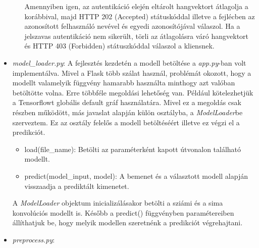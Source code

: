 \begin{itemize}
\begin{itemize}
		\newline
		\newline
		Amennyiben igen, az autentikáció elején eltárolt hangvektort átlagolja a korábbival, majd HTTP 202 (Accepted) státuskóddal illetve a fejlécben az azonosított felhasználó nevével és egyedi azonosítójával válaszol.
		\newline
		\newline
		Ha a jelszavas autentikáció nem sikerült, törli az átlagolásra váró hangvektort és HTTP 403 (Forbidden) státuszkóddal válaszol a kliensnek.
	\end{itemize}

	\item \emph{model\_loader.py}:
		A fejlesztés kezdetén a modell betöltése a \emph{app.py}-ban volt implementálva. Mivel a Flask több szálat használ, problémát okozott, hogy a modellt valamelyik függvény hamarabb használta minthogy azt valóban betöltötte volna.
		\newline
		\newline
		Erre többféle megoldási lehetőség van. Például kötelezhetjük a Tensorflowt globális default gráf használatára. Mivel ez a megoldás csak részben működött, más javaslat alapján külön osztályba, a \emph{ModelLoader}be szerveztem. Ez az osztály felelős a modell betöltéséért illetve ez végzi el a predikciót.
		\newline	

	\begin{itemize}
		\item load(file\_name): Betölti az paraméterként kapott útvonalon található modellt.
		\item predict(model\_input, model): A bemenet és a választott modell alapján visszaadja a prediktált kimenetet.  
	\end{itemize}

		A \emph{ModelLoader} objektum inicializálásakor betölti a sziámi és a sima konvolúciós modellt is. Később a predict() függvényben paramétereiben állíthatjuk be, hogy melyik modellen szeretnénk a predikciót végrehajtani.
		
	\item \emph{preprocess.py}:
		

\end{itemize}
